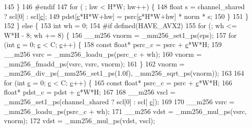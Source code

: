 \begin{DoxyCode}
145                     \}
146 \textcolor{preprocessor}{#endif}
147                     \textcolor{keywordflow}{for} ( ; hw < H*W; hw++) \{
148                         \textcolor{keywordtype}{float} s = channel\_shared ? scl[0] : scl[\hyperlink{CMakeCache_8txt_aac1d6a1710812201527c735f7c6afbaa}{c}];
149                         pdst[\hyperlink{CMakeCache_8txt_aac1d6a1710812201527c735f7c6afbaa}{c}*H*W+hw] = psrc[\hyperlink{CMakeCache_8txt_aac1d6a1710812201527c735f7c6afbaa}{c}*H*W+hw] * norm * s;
150                     \}
151                 \}
152             \} \textcolor{keywordflow}{else} \{
153                 \textcolor{keywordtype}{int} wh = 0;
154 \textcolor{preprocessor}{#if defined(HAVE\_AVX2)}
155                 \textcolor{keywordflow}{for} (; wh <= W*H - 8; wh += 8) \{
156                     \_\_m256 vnorm = \_mm256\_set1\_ps(eps);
157                     \textcolor{keywordflow}{for} (\textcolor{keywordtype}{int} \hyperlink{CMakeCache_8txt_aac1d6a1710812201527c735f7c6afbaa}{c} = 0; \hyperlink{CMakeCache_8txt_aac1d6a1710812201527c735f7c6afbaa}{c} < C; \hyperlink{CMakeCache_8txt_aac1d6a1710812201527c735f7c6afbaa}{c}++) \{
158                         \textcolor{keyword}{const} \textcolor{keywordtype}{float}* psrc\_c = psrc + \hyperlink{CMakeCache_8txt_aac1d6a1710812201527c735f7c6afbaa}{c}*W*H;
159                         \_\_m256 vsrc = \_mm256\_loadu\_ps(psrc\_c + wh);
160                         vnorm = \_mm256\_fmadd\_ps(vsrc, vsrc, vnorm);
161                     \}
162                     vnorm = \_mm256\_div\_ps(\_mm256\_set1\_ps(1.0f), \_mm256\_sqrt\_ps(vnorm));
163 
164                     \textcolor{keywordflow}{for} (\textcolor{keywordtype}{int} \hyperlink{CMakeCache_8txt_aac1d6a1710812201527c735f7c6afbaa}{c} = 0; \hyperlink{CMakeCache_8txt_aac1d6a1710812201527c735f7c6afbaa}{c} < C; \hyperlink{CMakeCache_8txt_aac1d6a1710812201527c735f7c6afbaa}{c}++) \{
165                         \textcolor{keyword}{const} \textcolor{keywordtype}{float}* psrc\_c = psrc + \hyperlink{CMakeCache_8txt_aac1d6a1710812201527c735f7c6afbaa}{c}*W*H;
166                         \textcolor{keywordtype}{float}* pdst\_c = pdst + \hyperlink{CMakeCache_8txt_aac1d6a1710812201527c735f7c6afbaa}{c}*W*H;
167 
168                         \_\_m256 vscl = \_mm256\_set1\_ps(channel\_shared ? scl[0] : scl[
      \hyperlink{CMakeCache_8txt_aac1d6a1710812201527c735f7c6afbaa}{c}]);
169 
170                         \_\_m256 vsrc = \_mm256\_loadu\_ps(psrc\_c + wh);
171                         \_\_m256 vdst = \_mm256\_mul\_ps(vsrc, vnorm);
172                         vdst = \_mm256\_mul\_ps(vdst, vscl);

\end{DoxyCode}
